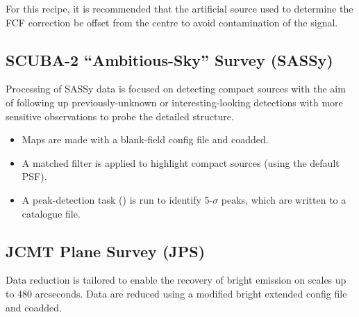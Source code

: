 For this recipe, it is recommended that the artificial source used to
determine the FCF correction be offset from the centre to avoid
contamination of the signal.

\subsection{SCUBA-2 ``Ambitious-Sky'' Survey (SASSy)}

Processing of SASSy data is focused on detecting compact sources with
the aim of following up previously-unknown or interesting-looking
detections with more sensitive observations to probe the detailed
structure.

\begin{itemize}
\item Maps are made with a blank-field config file and coadded.
\item A matched filter is applied to highlight compact sources (using
  the default PSF).
\item A peak-detection task () is run to identify
  5-$\sigma$ peaks, which are written to a catalogue file.
\end{itemize}

\subsection{JCMT Plane Survey (JPS)}

Data reduction is tailored to enable the recovery of bright emission on 
scales up to 480 arcseconds. Data are reduced using a modified bright 
extended config file and coadded.
